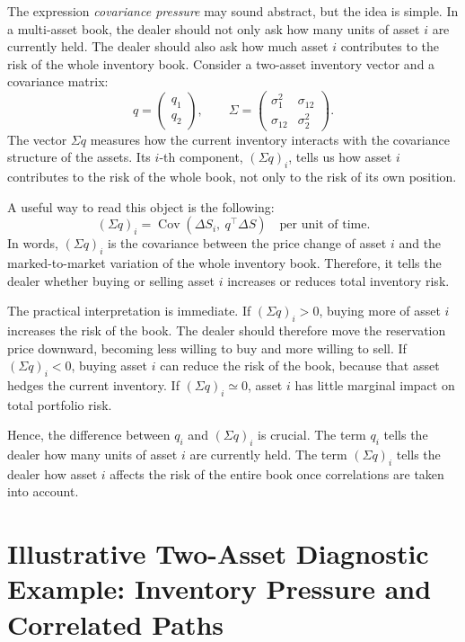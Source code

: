 \documentclass[a4paper,10pt,titlepage,oneside,openany]{book}
\theoremstyle{plain}\newtheorem{theorem}{Theorem}[chapter]
\theoremstyle{definition}\newtheorem{definition}{Definition}[chapter]
\theoremstyle{remark}\newtheorem{remark}{Remark}[chapter]
\begin{document}
The expression \emph{covariance pressure} may sound abstract, but the idea is simple. In a multi-asset book, the dealer should not only ask how many units of asset $i$ are currently held. The dealer should also ask how much asset $i$ contributes to the risk of the whole inventory book. Consider a two-asset inventory vector and a covariance matrix:
\[
q=
\begin{pmatrix}
q_1\\
q_2
\end{pmatrix},
\qquad
\Sigma=
\begin{pmatrix}
\sigma_1^2 & \sigma_{12}\\
\sigma_{12} & \sigma_2^2
\end{pmatrix}.
\]
The vector $\Sigma q$ measures how the current inventory interacts with the covariance structure of the assets. Its $i$-th component, $(\Sigma q)_i$, tells us how asset $i$ contributes to the risk of the whole book, not only to the risk of its own position.

A useful way to read this object is the following:
\[
(\Sigma q)_i
=
\operatorname{Cov}\!\left(\Delta S_i,\ q^\top \Delta S\right)
\quad
\text{per unit of time}.
\]
In words, $(\Sigma q)_i$ is the covariance between the price change of asset $i$ and the marked-to-market variation of the whole inventory book. Therefore, it tells the dealer whether buying or selling asset $i$ increases or reduces total inventory risk.

The practical interpretation is immediate. If $(\Sigma q)_i>0$, buying more of asset $i$ increases the risk of the book. The dealer should therefore move the reservation price downward, becoming less willing to buy and more willing to sell. If $(\Sigma q)_i<0$, buying asset $i$ can reduce the risk of the book, because that asset hedges the current inventory. If $(\Sigma q)_i\simeq 0$, asset $i$ has little marginal impact on total portfolio risk.

Hence, the difference between $q_i$ and $(\Sigma q)_i$ is crucial. The term $q_i$ tells the dealer how many units of asset $i$ are currently held. The term $(\Sigma q)_i$ tells the dealer how asset $i$ affects the risk of the entire book once correlations are taken into account.

\section{Illustrative Two-Asset Diagnostic Example: Inventory Pressure and Correlated Paths}
\end{document}
